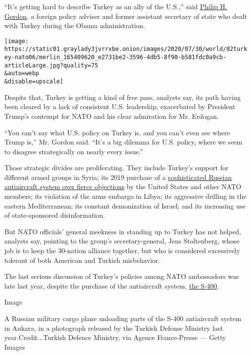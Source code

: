 ``It's getting hard to describe Turkey as an ally of the U.S.,'' said
\href{https://www.cfr.org/expert/philip-h-gordon}{Philip H. Gordon}, a
foreign policy adviser and former assistant secretary of state who dealt
with Turkey during the Obama administration.

\texttt{[image: https://static01.graylady3jvrrxbe.onion/images/2020/07/30/world/02turkey-nato06/merlin\_165409620\_e2731be2-3596-4db5-8f90-b581fdc0a9cb-articleLarge.jpg?quality=75\\\&auto=webp\\\&disable=upscale]}

Despite that, Turkey is getting a kind of free pass, analysts say, its
path having been cleared by a lack of consistent U.S. leadership,
exacerbated by President Trump's contempt for NATO and his clear
admiration for Mr. Erdogan.

``You can't say what U.S. policy on Turkey is, and you can't even see
where Trump is,'' Mr. Gordon said. ``It's a big dilemma for U.S. policy,
where we seem to disagree strategically on nearly every issue.''

Those strategic divides are proliferating. They include Turkey's support
for different armed groups in Syria; its 2019 purchase of a
\href{https://www.nytimes3xbfgragh.onion/2019/07/12/world/europe/turkey-russia-missiles.html?searchResultPosition=1}{sophisticated
Russian antiaircraft system over fierce objections} by the United States
and other NATO members; its violation of the arms embargo in Libya; its
aggressive drilling in the eastern Mediterranean; its constant
demonization of Israel; and its increasing use of state-sponsored
disinformation.

But NATO officials' general meekness in standing up to Turkey has not
helped, analysts say, pointing to the group's secretary-general, Jens
Stoltenberg, whose job is to keep the 30-nation alliance together, but
who is considered excessively tolerant of both American and Turkish
misbehavior.

The last serious discussion of Turkey's policies among NATO ambassadors
was late last year, despite the purchase of the antiaircraft system,
\href{https://www.nytimes3xbfgragh.onion/2019/07/12/world/russia-turkey-missile-explain.html?searchResultPosition=1}{the
S-400}.

Image

A Russian military cargo plane unloading parts of the S-400 antiaircraft
system in Ankara, in a photograph released by the Turkish Defense
Ministry last year.Credit...Turkish Defence Ministry, via Agence
France-Presse --- Getty Images


